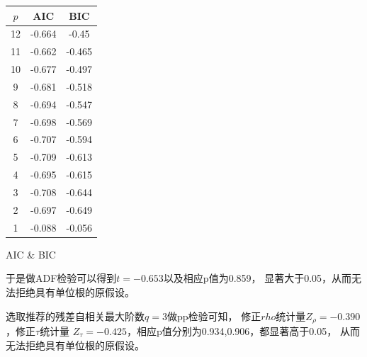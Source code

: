 \documentclass[cn]{homework}
\begin{document}
    \begin{margintable}
        \centering
        \begin{tabular}{ccc}
            \toprule
            $p$ & AIC & BIC \\
            \midrule
            12 & -0.664 & -0.45 \\
            11 & -0.662 & -0.465 \\
            10 & -0.677 & -0.497 \\
            9 & -0.681 & -0.518 \\
            8 & -0.694 & -0.547 \\
            7 & -0.698 & -0.569 \\
            6 & -0.707 & -0.594 \\
            5 & -0.709 & -0.613 \\
            4 & -0.695 & -0.615 \\
            3 & -0.708 & -0.644 \\
            2 & -0.697 & -0.649 \\
            1 & -0.088 & -0.056 \\
            \bottomrule
        \end{tabular}
        \caption{AIC \& BIC}
        \label{tab: INDPROD ABIC}
    \end{margintable}

    于是做ADF检验可以得到$t=-0.653$以及相应p值为0.859，
    显著大于0.05，从而无法拒绝具有单位根的原假设。

    选取推荐的残差自相关最大阶数$q=3$做pp检验可知，
    修正$rho$统计量$Z_\rho=-0.390$，修正$\tau$统计量
    $Z_\tau=-0.425$，相应p值分别为0.934,0.906，都显著高于0.05，
    从而无法拒绝具有单位根的原假设。
\end{document}
